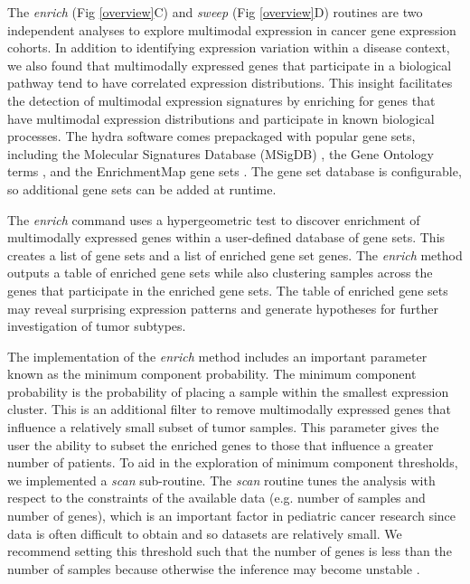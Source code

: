 \documentclass[10pt,letterpaper]{article}
\begin{document}
The \textit{enrich} (Fig \ref{overview}C) and \textit{sweep} (Fig \ref{overview}D) routines are two independent analyses to explore multimodal expression in cancer gene expression cohorts. In addition to identifying expression variation within a disease context, we also found that multimodally expressed genes that participate in a biological pathway tend to have correlated expression distributions. This insight facilitates the detection of multimodal expression signatures by enriching for genes that have multimodal expression distributions and participate in known biological processes. The hydra software comes prepackaged with popular gene sets, including the Molecular Signatures Database (MSigDB) \cite{liberzonMolecularSignaturesDatabase2011}, the Gene Ontology terms \cite{Ashburner2000, gene2018gene}, and the EnrichmentMap gene sets \cite{merico2010enrichment}. The gene set database is configurable, so additional gene sets can be added at runtime.

The \textit{enrich} command uses a hypergeometric test \cite{yuClusterProfilerPackageComparing2012} to discover enrichment of multimodally expressed genes within a user-defined database of gene sets. This creates a list of gene sets and a list of enriched gene set genes. The \textit{enrich} method outputs a table of enriched gene sets while also clustering samples across the genes that participate in the enriched gene sets. The table of enriched gene sets may reveal surprising expression patterns and generate hypotheses for further investigation of tumor subtypes.

The implementation of the \textit{enrich} method includes an important parameter known as the minimum component probability. The minimum component probability is the probability of placing a sample within the smallest expression cluster. This is an additional filter to remove multimodally expressed genes that influence a relatively small subset of tumor samples. This parameter gives the user the ability to subset the enriched genes to those that influence a greater number of patients. To aid in the exploration of minimum component thresholds, we implemented a \textit{scan} sub-routine. The \textit{scan} routine tunes the analysis with respect to the constraints of the available data (e.g. number of samples and number of genes), which is an important factor in pediatric cancer research since data is often difficult to obtain and so datasets are relatively small. We recommend setting this threshold such that the number of genes is less than the number of samples because otherwise the inference may become unstable \cite{caiConstrainedL1Minimization2011}.
\end{document}
